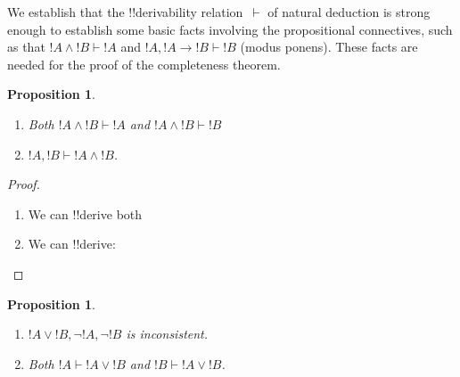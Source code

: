 \documentclass[10pt,a4paper]{article}
\theoremstyle{plain}
\newtheorem{prop}[thm]{Proposition}
\theoremstyle{definition}
\theoremstyle{remark}
\newenvironment{explain}{}{}
\newcommand*{\ollabel}[1]{\label{#1}}
\providecommand{\AxiomC}[1]{}
\providecommand{\UnaryInfC}[1]{}
\providecommand{\BinaryInfC}[1]{}
\providecommand{\RightLabel}[1]{}
\providecommand{\DisplayProof}{}
\newenvironment{prooftree}{}{}
\providecommand{\lif}{\mathbin{\rightarrow}}
\providecommand{\Proves}{\mathrel{\vdash}}
\providecommand{\Elim}[1]{}
\providecommand{\Intro}[1]{}
\providecommand{\Intro}{\mathrm{I}}
\begin{document}
\begin{explain}
  We establish that the !!{derivability} relation~$\Proves$ of natural
 deduction is strong enough to establish some basic facts
  involving the propositional connectives, such as that $!A \land !B
  \Proves !A$ and $!A, !A \lif !B \Proves !B$ (modus ponens). These
  facts are needed for the proof of the completeness theorem.
\end{explain}

\begin{prop}\ollabel{prop:provability-land}
  \begin{enumerate}
  \item \ollabel{prop:provability-land-left} Both $!A \land !B \Proves
    !A$ and $!A \land !B \Proves !B$
  \item \ollabel{prop:provability-land-right} $!A, !B \Proves !A \land !B$.
  \end{enumerate}
\end{prop}

\begin{proof}
  \begin{enumerate}
  \item We can !!{derive} both
    \begin{prooftree}
      \AxiomC{$!A \land !B$}
      \RightLabel{\Elim{\land}}
      \UnaryInfC{$!A$}
      \DisplayProof\qquad\bottomAlignProof
      \AxiomC{$!A \land !B$}
      \RightLabel{\Elim{\land}}
      \UnaryInfC{$!B$}
    \end{prooftree}
  \item We can !!{derive}:
    \begin{prooftree}
      \AxiomC{$!A$}
      \AxiomC{$!B$}
      \RightLabel{\Intro{\land}}
      \BinaryInfC{$!A \land !B$}
    \end{prooftree}
  \end{enumerate}
\end{proof}


\begin{prop}\ollabel{prop:provability-lor}
  \begin{enumerate}
  \item $!A \lor !B, \lnot !A, \lnot !B$ is inconsistent.
  \item Both $!A \Proves !A \lor !B$ and $!B \Proves !A \lor !B$.
  \end{enumerate}
\end{prop}
\end{document}
